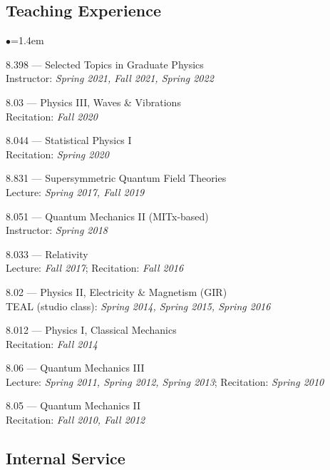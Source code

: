 \documentclass[11pt]{article}
\newcommand{\heading}[1]{\vspace{0in}\subsection*{#1} \vspace{.02in}}
\newcommand{\sh}{\phantom{.....}}
\newcommand{\bbl}{\begin{list}{$\bullet$}{\leftmargin=1.4em \itemsep=-1pt}}
\newcommand{\el}{\end{list}}
\begin{document}

\heading{Teaching Experience}

\bbl
\item 8.398 --- Selected Topics in Graduate Physics
\\ \sh Instructor:  \textit{Spring 2021, Fall 2021, Spring 2022}
\item 8.03 --- Physics III, Waves \& Vibrations
\\ \sh Recitation:  \textit{Fall 2020}
\item 8.044 --- Statistical Physics I
\\ \sh Recitation:  \textit{Spring 2020}
\item 8.831 --- Supersymmetric Quantum Field Theories
\\ \sh Lecture:  \textit{Spring 2017, Fall 2019}
\item 8.051 --- Quantum Mechanics II (MITx-based)
\\ \sh Instructor: \textit{Spring 2018}
\item 8.033 --- Relativity
\\ \sh Lecture:  \textit{Fall 2017}; Recitation:  \textit{Fall 2016}
\item 8.02 --- Physics II, Electricity \& Magnetism (GIR)
\\ \sh TEAL (studio class): \textit{Spring 2014, Spring 2015, Spring 2016}
\item 8.012 --- Physics I, Classical Mechanics
\\ \sh Recitation:  \textit{Fall 2014}
\item 8.06 --- Quantum Mechanics III
\\ \sh Lecture: \textit{Spring 2011, Spring 2012, Spring 2013}; Recitation: \textit{Spring 2010}
\item 8.05 --- Quantum Mechanics II
\\ \sh Recitation:  \textit{Fall 2010, Fall 2012}
\el


\heading{Internal Service}
\end{document}

